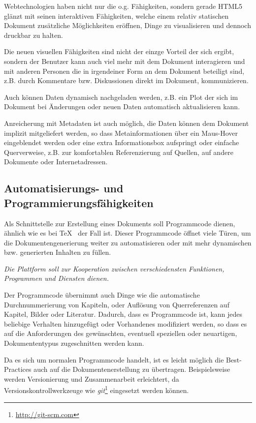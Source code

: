 Webtechnologien haben nicht nur die o.g. Fähigkeiten, sondern gerade
HTML5 glänzt mit seinen interaktiven Fähigkeiten, welche einem relativ
statischen Dokument zusätzliche Möglichkeiten eröffnen, Dinge zu
visualisieren und dennoch druckbar zu halten.

Die neuen visuellen Fähigkeiten sind nicht der einzge Vorteil der sich ergibt,
sondern der Benutzer kann auch viel mehr mit dem Dokument interagieren
und mit anderen Personen die in irgendeiner Form an dem Dokument beteiligt
sind, z.B. durch Kommentare bzw. Diskussionen direkt im Dokument,
kommunizieren.

Auch können Daten dynamisch nachgeladen werden, z.B. ein Plot der sich
im Dokument bei Änderungen oder neuen Daten automatisch aktualisieren kann.

Anreicherung mit Metadaten ist auch möglich, die Daten können dem Dokument
implizit mitgeliefert werden, so dass Metainformationen über ein Maus-Hover
eingeblendet werden oder eine extra Informationsbox aufspringt oder einfache
Querverweise, z.B. zur komfortablen Referenzierung auf Quellen,
auf andere Dokumente oder Internetadressen.

\subsection{Automatisierungs- und Programmierungsfähigkeiten}\label{sec-idee-szenarien}

Als Schnittstelle zur Erstellung eines Dokuments soll Programmcode
dienen, ähnlich wie es bei \TeX~ der Fall ist. Dieser Programmcode
öffnet viele Türen, um die Dokumentengenerierung weiter
zu automatisieren oder mit mehr dynamischen bzw. generierten Inhalten
zu füllen.

\emph{Die Plattform soll zur Kooperation zwischen verschiedensten
Funktionen, Programmen und Diensten dienen.}

Der Programmcode übernimmt auch Dinge wie die automatische Durchnummerierung
von Kapiteln, oder Auflösung von Querreferenzen auf Kapitel, Bilder oder
Literatur. Dadurch, dass es Programmcode ist, kann jedes beliebige Verhalten
hinzugefügt oder Vorhandenes modifiziert werden, so dass es auf die Anforderungen
des gewünschten, eventuell speziellen oder neuartigen, Dokumententypus
zugeschnitten werden kann.

Da es sich um normalen Programmcode handelt, ist es leicht möglich die
Best-Practices auch auf die Dokumentenerstellung zu übertragen.
Beispielsweise werden Versionierung und Zusammenarbeit erleichtert,
da Versionskontrollwerkzeuge wie \emph{git}\footnote{\url{http://git-scm.com}}
eingesetzt werden können.

